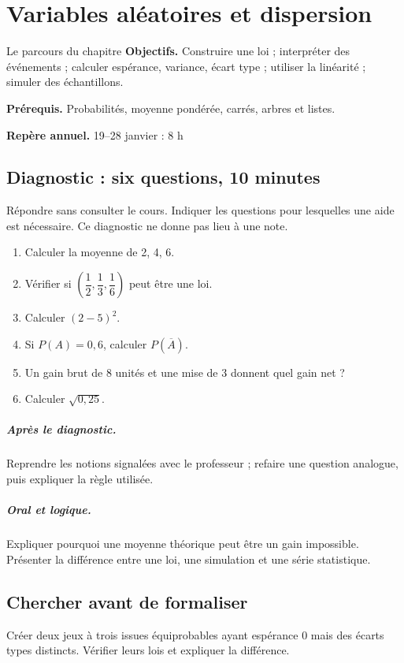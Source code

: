 \chapter{Variables aléatoires et dispersion}\label{C08}
\begin{repere}{Le parcours du chapitre}
\textbf{Objectifs.} Construire une loi ; interpréter des événements ; calculer espérance, variance, écart type ; utiliser la linéarité ; simuler des échantillons.

\textbf{Prérequis.} Probabilités, moyenne pondérée, carrés, arbres et listes.

\textbf{Repère annuel.} 19–28 janvier : 8 h\end{repere}
\section*{Diagnostic : six questions, 10 minutes}\label{C08-D}
Répondre sans consulter le cours. Indiquer les questions pour lesquelles une aide est nécessaire. Ce diagnostic ne donne pas lieu à une note.
\begin{enumerate}
\item Calculer la moyenne de 2, 4, 6.
\item Vérifier si $(\dfrac{1}{2},\dfrac{1}{3},\dfrac{1}{6})$ peut être une loi.
\item Calculer $(2-5)^2$.
\item Si $P(A)=0{,}6$, calculer $P(\overline A)$.
\item Un gain brut de 8 unités et une mise de 3 donnent quel gain net ?
\item Calculer $\sqrt{0{,}25}$.
\end{enumerate}
\paragraph{Après le diagnostic.} Reprendre les notions signalées avec le professeur ; refaire une question analogue, puis expliquer la règle utilisée.
\paragraph{Oral et logique.} Expliquer pourquoi une moyenne théorique peut être un gain impossible. Présenter la différence entre une loi, une simulation et une série statistique.
\clearpage
\section*{Chercher avant de formaliser}\label{C08-RECH}
Créer deux jeux à trois issues équiprobables ayant espérance 0 mais des écarts types distincts. Vérifier leurs lois et expliquer la différence.
